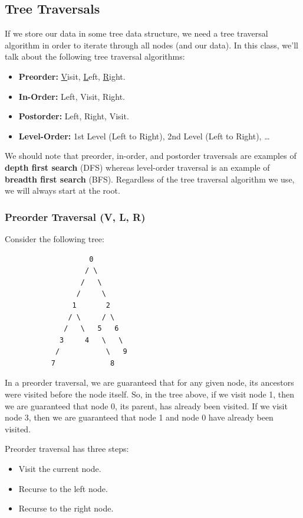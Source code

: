 \documentclass[letterpaper]{article}
\begin{document}
\subsection{Tree Traversals}
If we store our data in some tree data structure, we need a tree traversal algorithm in order to iterate through all nodes (and our data). In this class, we'll talk about the following tree traversal algorithms: 
\begin{itemize}
    \item \textbf{Preorder:} \underline{V}isit, \underline{L}eft, \underline{R}ight. 
    \item \textbf{In-Order:} Left, Visit, Right. 
    \item \textbf{Postorder:} Left, Right, Visit. 
    \item \textbf{Level-Order:} 1st Level (Left to Right), 2nd Level (Left to Right), \dots
\end{itemize} 
We should note that preorder, in-order, and postorder traversals are examples of \textbf{depth first search} (DFS) whereas level-order traversal is an example of \textbf{breadth first search} (BFS). Regardless of the tree traversal algorithm we use, we will always start at the root. 

\subsubsection{Preorder Traversal (V, L, R)}
Consider the following tree: 
\begin{verbatim}
                    0
                   / \
                  /   \
                 /     \
                1       2 
               / \     / \ 
              /   \   5   6
             3     4   \   \ 
            /           \   9
           7             8
\end{verbatim}
In a preorder traversal, we are guaranteed that for any given node, its ancestors were visited before the node itself. So, in the tree above, if we visit node 1, then we are guaranteed that node 0, its parent, has already been visited. If we visit node 3, then we are guaranteed that node 1 and node 0 have already been visited.

\bigskip 

Preorder traversal has three steps: 
\begin{itemize}
    \item Visit the current node. 
    \item Recurse to the left node. 
    \item Recurse to the right node. 
\end{itemize}
\end{document}
